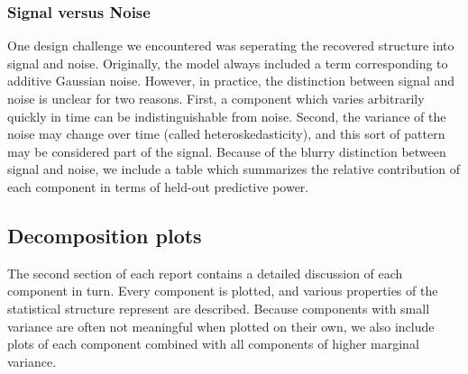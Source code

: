 \documentclass{article} %
\begin{document}
\subsubsection{Signal versus Noise}

One design challenge we encountered was seperating the recovered structure into signal and noise.  Originally, the model always included a term corresponding to \iid{} additive Gaussian noise.  However, in practice, the distinction between signal and noise is unclear for two reasons.  First, a component which varies arbitrarily quickly in time can be indistinguishable from noise.  Second, the variance of the noise may change over time (called heteroskedasticity), and this sort of pattern may be considered part of the signal.
Because of the blurry distinction between signal and noise, we include a table which summarizes the relative contribution of each component in terms of held-out predictive power.%
%
%
%



\subsection{Decomposition plots}

The second section of each report contains a detailed discussion of each component in turn.  Every component is plotted, and various properties of the statistical structure represent are described.  Because components with small variance are often not meaningful when plotted on their own, we also include plots of each component combined with all components of higher marginal variance.
\end{document}
